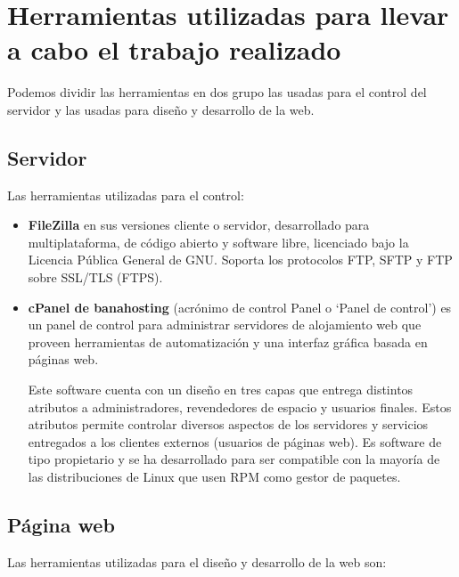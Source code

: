 		\newpage
		
		
		\section{Herramientas utilizadas para llevar a cabo el trabajo realizado}
		
		Podemos dividir las herramientas en dos grupo las usadas para el control del servidor y las usadas para diseño y desarrollo de la web.
		
		\subsection{Servidor}
		
		Las herramientas utilizadas para el control:
		
		\begin{itemize}
			\item \textbf{FileZilla} en sus versiones cliente o servidor, desarrollado para multiplataforma, de código abierto y software libre, licenciado bajo la Licencia Pública General de GNU. Soporta los protocolos FTP, SFTP y FTP sobre SSL/TLS (FTPS).
			 
			\item \textbf{cPanel de banahosting} (acrónimo de control Panel o ‘Panel de control’) es un panel de control para administrar servidores de alojamiento web que proveen herramientas de automatización y una interfaz gráfica basada en páginas web.
			
			Este software cuenta con un diseño en tres capas que entrega distintos atributos a administradores, revendedores de espacio y usuarios finales. Estos atributos permite controlar diversos aspectos de los servidores y servicios entregados a los clientes externos (usuarios de páginas web). Es software de tipo propietario y se ha desarrollado para ser compatible con la mayoría de las distribuciones de Linux que usen RPM como gestor de paquetes. 
		\end{itemize}
	
		\subsection{Página web}
		
		Las herramientas utilizadas para el diseño y desarrollo de la web son:
		
